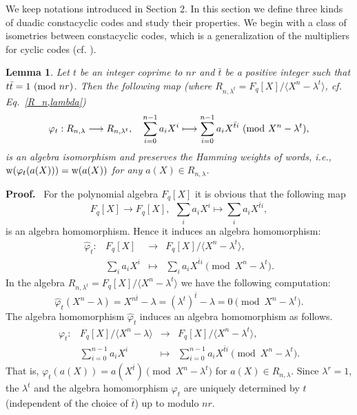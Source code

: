 \documentclass{article}
\newtheorem{Lemma}[Theorem]{Lemma}
\numberwithin{equation}{section}
\numberwithin{table}{section}
\def\pf{\par{\bf Proof.}~ }
\def\M{{\varphi}} \def\N{{\psi}} \def\m{{\mu}}
\begin{document}
We keep notations introduced in Section 2.
In this section we define three kinds of duadic constacyclic codes and
study their properties. We begin with a class of isometries 
between constacyclic codes, which is a generalization of the multipliers
for cyclic codes (cf. \cite[\S4.3, eq.(4.4)]{HP}).

\begin{Lemma}\label{isometry}
Let $t$ be an integer coprime to $nr$ and $\bar t$ be a positive integer
such that $t\bar t=1~({\rm mod}~nr)$.
Then the following map
(where $R_{n,\lambda^t}=F_q[X]/\langle X^n-\lambda^t\rangle$,
cf. Eq.~\eqref{R_n,lambda})
$$
\M_t:  R_{n,\lambda} \longrightarrow  R_{n,\lambda^t},\quad
  \sum\limits_{i=0}^{n-1}a_iX^i \longmapsto
\sum\limits_{i=0}^{n-1}a_i X^{\bar t i}
 ~({\rm mod}~{X^n-\lambda^{t}}),
$$
is an algebra isomorphism and preserves the Hamming weights of words, i.e.,
${\rm w}(\M _t(a(X)))={\rm w}(a(X))$ for any $a(X)\in R_{n,\lambda}$.
\end{Lemma}

\pf 
For the polynomial algebra $F_q[X]$ 
it is obvious that the following map
$$
F_q[X]  \longrightarrow  F_q[X],~~
\sum\limits_{i}a_iX^i\longmapsto
\sum\limits_{i}a_i X^{\bar t i},
$$
is an algebra homomorphism. Hence it induces an algebra homomorphism:
$$\begin{array}{crcl}
\hat\M _t: & F_q[X] & \longrightarrow
  & F_q[X]/\langle X^n-\lambda^{t}\rangle,\\[3pt]
&\sum\limits_{i} a_i X^i &\longmapsto&
\sum\limits_{i}a_i X^{\bar t i}
\pmod{X^n-\lambda^{t}}.
\end{array}$$
In the algebra $R_{n,\lambda^t}=F_q[X]/\langle X^n-\lambda^{t}\rangle$
we have the following computation:
$$
\hat\M _{t}(X^n-\lambda)=X^{n\bar t}-\lambda
=(\lambda^{t})^{\bar t}-\lambda=0 \pmod{X^n-\lambda^{t}}.
$$
The algebra homomorphism $\hat\M _t$ induces an
algebra homomorphism as follows.
$$\begin{array}{crcl}
\M _t: & F_q[X]/\langle X^n-\lambda\rangle & \longrightarrow
  & F_q[X]/\langle X^n-\lambda^{t}\rangle,\\[3pt]
&\sum\limits_{i=0}^{n-1}a_iX^i&\longmapsto&
\sum\limits_{i=0}^{n-1}a_i X^{\bar t i} \pmod{X^n-\lambda^t}.
\end{array}$$
That is, $\M_t(a(X))=a(X^{\bar t})\!\pmod{X^n-\lambda^t}$ 
for $a(X)\in R_{n,\lambda}$.
Since $\lambda^r=1$, the $\lambda^t$ and the algebra homomorphism  
$\M_t$ are uniquely determined by $t$ (independent of the choice of $\bar t$)
up to modulo $nr$.
\end{document}
